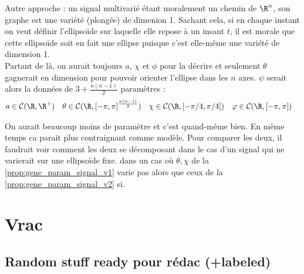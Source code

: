 \begin{proposition}\label{prop:gene_param_signal_v2}
Autre approche : un signal multivarié étant moralement un chemin de $\R^n$, son graphe est une variété (plongée) de dimenion 1. Sachant cela, si en chaque instant on veut définir l'ellipsoïde sur laquelle elle repose à un insant $t$, il est morale que cette ellipsoïde soit en fait une ellipse puisque c'est elle-même une variété de dimension 1.
\\
Partant de là, on aurait toujours $a$, $\chi$ et $\phi$ pour la décrire et seulement $\theta$ gagnerait en dimension pour pouvoir orienter l'ellipse dans les $n$ axes. $\psi$ serait alors la données de $3+\frac{n(n-1)}{2}$ paramètres :
\begin{align*}
	a&\in\mathcal{C}(\R,\R^+)  &  \theta&\in\mathcal{C}(\R, [-\pi,\pi]^{\frac{n(n-1)}{2}})  &  \chi&\in\mathcal{C}(\R, [-\pi/4,\pi/4])  &  \varphi&\in\mathcal{C}(\R, [-\pi,\pi])
\end{align*}
\end{proposition}

On aurait beaucoup moins de paramètre et c'est quand-même bien. En même temps ca parait plus contraignant comme modèle. Pour comparer les deux, il faudrait voir comment les deux se décomposant dans le cas d'un signal qui ne varierait sur une ellipsoïde fixe. \ie dans un cas où $\theta,\chi$ de la \cref{prop:gene_param_signal_v1} varie pas alors que ceux de la \cref{prop:gene_param_signal_v2} si.



\section{Vrac}

\subsection{Random  stuff ready pour rédac (+labeled)}

